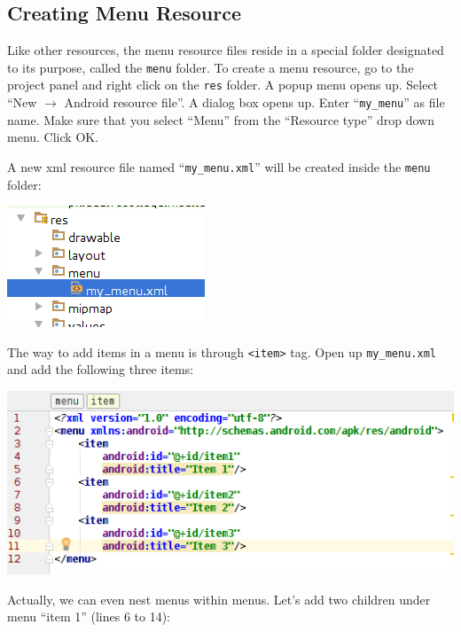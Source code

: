 \subsection{Creating Menu Resource}
\label{PMAB:createingMenuResource}
Like other resources, the menu resource files reside in a special folder designated to its purpose, called the \texttt{menu} folder. To create a menu resource, go to the project panel and right click on the \texttt{res} folder. A popup menu opens up. Select ``New $\rightarrow$ Android resource file''. A dialog box opens up. Enter ``\texttt{my\_menu}'' as file name. Make sure that you select ``Menu'' from the ``Resource type'' drop down menu. Click OK.

A new xml resource file named ``\texttt{my\_menu.xml}'' will be created inside the \texttt{menu} folder:

\begin{center}
	\includegraphics[scale=0.4]{chapters/ch07/images/38}
\end{center}

The way to add items in a menu is through \texttt{<item>} tag. Open up \texttt{my\_menu.xml} and add the following three items:

\begin{center}
	\includegraphics[scale=0.4]{chapters/ch07/images/39}
\end{center}

Actually, we can even nest menus within menus. Let's add two children under menu ``item 1'' (lines 6 to 14):

